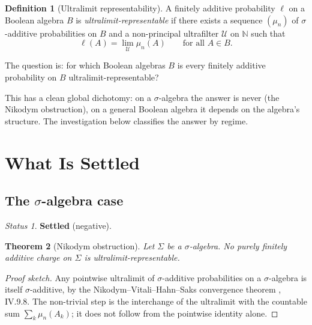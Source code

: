 \documentclass[11pt]{article}
\newtheorem{theorem}{Theorem}
\theoremstyle{definition}
\newtheorem{definition}[theorem]{Definition}
\theoremstyle{remark}
\newtheorem*{status}{Status}
\newcommand{\N}{\mathbb{N}}
\begin{document}
\begin{definition}[Ultralimit representability]
A finitely additive probability $\ell$ on a Boolean algebra $B$ is
\emph{ultralimit-representable} if there exists a sequence $(\mu_n)$ of
$\sigma$-additive probabilities on $B$ and a non-principal ultrafilter $\mathcal{U}$
on $\N$ such that
\[
  \ell(A) = \lim_{\mathcal{U}} \mu_n(A) \qquad \text{for all } A \in B.
\]
\end{definition}

The question is: for which Boolean algebras $B$ is every finitely additive
probability on $B$ ultralimit-representable?

This has a clean global dichotomy: on a $\sigma$-algebra the answer is never (the
Nikodym obstruction), on a general Boolean algebra it depends on the algebra's
structure. The investigation below classifies the answer by regime.

\section{What Is Settled}

\subsection{The \texorpdfstring{$\sigma$}{sigma}-algebra case}

\begin{status}
\textbf{Settled} (negative).
\end{status}

\begin{theorem}[Nikodym obstruction]
Let $\Sigma$ be a $\sigma$-algebra. No purely finitely additive charge on $\Sigma$
is ultralimit-representable.
\end{theorem}

\begin{proof}[Proof sketch]
Any pointwise ultralimit of $\sigma$-additive probabilities on a $\sigma$-algebra
is itself $\sigma$-additive, by the Nikodym--Vitali--Hahn--Saks convergence theorem
\cite{DunfordSchwartz1958}, IV.9.8. The non-trivial step is the interchange of the
ultralimit with the countable sum $\sum_k\mu_n(A_k)$; it does not follow from the
pointwise identity alone.
\end{proof}
\end{document}
